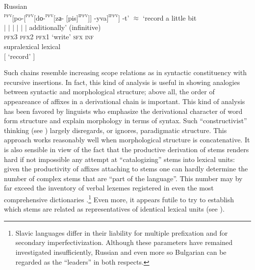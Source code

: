 \documentclass[output=paper]{langscibook}
\begin{document}
\ea \label{ex:wiemer:7} 
{Russian} \\ 
\textsc{\textsuperscript{pfv}}[{po{}-}[\textsc{\textsuperscript{pfv}}[{d{о}{}-}\textsc{\textsuperscript{pfv}}[{z{а}{}-} [{pis}]\textsc{\textsuperscript{ipfv}}]] {{}-yva}]\textsc{\textsuperscript{ipfv}}] {{}-t’} ${\approx}$ ‘record a little bit \\ 
\hspace*{0.6cm} ${\mid}$  \hspace*{1.1cm}${\mid}$  \hspace*{1.1cm}${\mid}$  \hspace*{0.5cm}${\mid}$ \hspace*{1.4cm}${\mid}$  \hspace*{1.4cm}${\mid}$ \hfill  additionally’ (infinitive)\hbox{}\\
\hspace*{0.2cm} \textsc{pfx3} \hspace*{0.3cm}  \textsc{pfx2} \hspace*{0.4cm}  \textsc{pfx1}   ‘write’  \hspace*{0.4cm}  \textsc{sfx} \hspace*{0.9cm} \textsc{inf}\\
\hspace*{0.2cm} supralexical \hspace*{0.6cm}lexical \\
\hspace*{3cm}[   ‘record’   ]
\z



Such chains resemble increasing scope relations as in syntactic constituency with recursive insertions. In fact, this kind of analysis is useful in showing analogies between syntactic and morphological structure; above all, the order of appeareance of affixes in a derivational chain is important. This kind of analysis has been favored by linguists who emphasize the derivational character of word form structure and explain morphology in terms of syntax. Such ``constructivist'' thinking (see ) largely disregards, or ignores, paradigmatic structure. This approach works reasonably well when morphological structure is concatenative. It is also sensible in view of the fact that the productive derivation of stems renders hard if not impossible any attempt at “catalogizing” stems into lexical units: given the productivity of affixes attaching to stems one can hardly determine the number of complex stems that are “part of the language”. This number may by far exceed the inventory of verbal lexemes registered in even the most comprehensive dictionaries \citep[247]{Tatevosov2015}.\footnote{Slavic languages differ in their liability for multiple prefixation and for secondary imperfectivization. Although these parameters have remained investigated insufficiently, Russian and even more so Bulgarian can be regarded as the “leaders” in both respects.} Even more, it appears futile to try to establish which stems are related as representatives of identical lexical units (see ).
\end{document}
